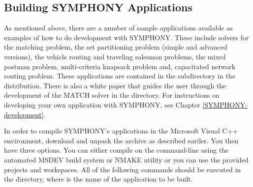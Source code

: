 \subsection{Building SYMPHONY Applications}
\label{build_app_msvc}

As mentioned above, there are a number of sample applications available as
examples of how to do development with SYMPHONY. These include solvers for the
matching problem, the set partitioning problem (simple and advanced versions),
the vehicle routing and traveling salesman problems, the mixed postman
problem, multi-criteria knapsack problem and, capacitated network routing
problem. These applications are contained in the 
subdirectory in the distribution. There is also a white paper that guides the
user through the development of the MATCH solver in the 
directory. For instructions on developing your own application with SYMPHONY,
see Chapter \ref{SYMPHONY-development}.

In order to compile SYMPHONY's applications in the Microsoft Visual C++
environment, download  and unpack the archive as
described eariler. You then have three options. You can either compile on the
command-line using the automated MSDEV build system or NMAKE utility or you
can use the provided projects and workspaces. All of the following commands
should be executed in the  directory, where  is the name of the application to be built.

